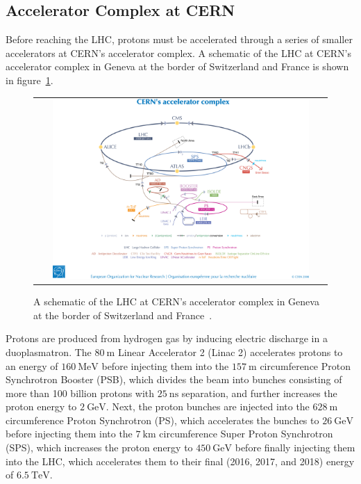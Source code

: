 \subsection{Accelerator Complex at CERN}
Before reaching the LHC, protons must be accelerated through a series of smaller accelerators at CERN's accelerator complex.
A schematic of the LHC at CERN's accelerator complex in Geneva at the border of Switzerland and France is shown in figure~\ref{CERN_LHC}.
\begin{figure}[htb]
  \begin{center}
    \begin{tabular}{c}
        \includegraphics[width=0.9\textwidth]{fig_LHC_CMS/CERN_LHC.png}
    \end{tabular}
    \caption{A schematic of the LHC at CERN's accelerator complex in Geneva at the border of Switzerland and France~\cite{Christiane:1260465}.
            }
    \label{CERN_LHC}
  \end{center}
\end{figure}
Protons are produced from hydrogen gas by inducing electric discharge in a duoplasmatron.
The $\SI{80}{\m}$ Linear Accelerator 2 (Linac 2) accelerates protons to an energy of $\SI{160}{\MeV}$ before injecting them into the $\SI{157}{\m}$ circumference Proton Synchrotron Booster (PSB), which divides the beam into bunches consisting of more than 100 billion protons with $\SI{25}{\ns}$ separation, and further increases the proton energy to $\SI{2}{\GeV}$.
Next, the proton bunches are injected into the $\SI{628}{\m}$ circumference Proton Synchrotron (PS), which accelerates the bunches to $\SI{26}{\GeV}$ before injecting them into the $\SI{7}{\km}$ circumference Super Proton Synchrotron (SPS), which increases the proton energy to $\SI{450}{\GeV}$ before finally injecting them into the LHC, which accelerates them to their final (2016, 2017, and 2018) energy of $\SI{6.5}{\TeV}$.

